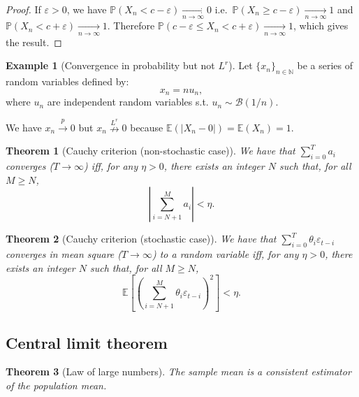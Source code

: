 \documentclass[
  12pt,
]{book}
\newtheorem{theorem}{Theorem}[chapter]
\theoremstyle{definition}
\theoremstyle{definition}
\newtheorem{example}{Example}[chapter]
\theoremstyle{definition}
\theoremstyle{definition}
\theoremstyle{remark}
\begin{document}
\begin{proof}
If \(\varepsilon>0\), we have \(\mathbb{P}(X_n < c - \varepsilon) \underset{n \rightarrow \infty}{\rightarrow} 0\) i.e.~\(\mathbb{P}(X_n \ge c - \varepsilon) \underset{n \rightarrow \infty}{\rightarrow} 1\) and \(\mathbb{P}(X_n < c + \varepsilon) \underset{n \rightarrow \infty}{\rightarrow} 1\). Therefore \(\mathbb{P}(c - \varepsilon \le X_n < c + \varepsilon) \underset{n \rightarrow \infty}{\rightarrow} 1\),
which gives the result.
\end{proof}

\begin{example}[Convergence in probability but not $L^r$]
\protect\hypertarget{exm:plimButNotLr}{}\label{exm:plimButNotLr}Let \(\{x_n\}_{n \in \mathbb{N}}\) be a series of random variables defined by:
\[
x_n = n u_n,
\]
where \(u_n\) are independent random variables s.t. \(u_n \sim \mathcal{B}(1/n)\).

We have \(x_n \overset{p}{\rightarrow} 0\) but \(x_n \overset{L^r}{\nrightarrow} 0\) because \(\mathbb{E}(|X_n-0|)=\mathbb{E}(X_n)=1\).
\end{example}

\begin{theorem}[Cauchy criterion (non-stochastic case)]
\protect\hypertarget{thm:cauchycritstatic}{}\label{thm:cauchycritstatic}We have that \(\sum_{i=0}^{T} a_i\) converges (\(T \rightarrow \infty\)) iff, for any \(\eta > 0\), there exists an integer \(N\) such that, for all \(M\ge N\),
\[
\left|\sum_{i=N+1}^{M} a_i\right| < \eta.
\]
\end{theorem}

\begin{theorem}[Cauchy criterion (stochastic case)]
\protect\hypertarget{thm:cauchycritstochastic}{}\label{thm:cauchycritstochastic}We have that \(\sum_{i=0}^{T} \theta_i \varepsilon_{t-i}\) converges in mean square (\(T \rightarrow \infty\)) to a random variable iff, for any \(\eta > 0\), there exists an integer \(N\) such that, for all \(M\ge N\),
\[
\mathbb{E}\left[\left(\sum_{i=N+1}^{M} \theta_i \varepsilon_{t-i}\right)^2\right] < \eta.
\]
\end{theorem}

\hypertarget{CLTappend}{%
\subsection{Central limit theorem}\label{CLTappend}}

\begin{theorem}[Law of large numbers]
\protect\hypertarget{thm:LLNappendix}{}\label{thm:LLNappendix}The sample mean is a consistent estimator of the population mean.
\end{theorem}
\end{document}
